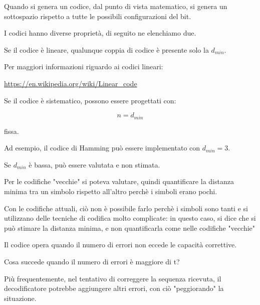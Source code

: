 Quando si genera un codice, dal punto di vista matematico, 
si genera un sottospazio rispetto a tutte le possibili configurazioni del bit. \newline 

I codici hanno diverse proprietà, di seguito ne elenchiamo due. \newline  

Se il codice è lineare, 
qualunque coppia di codice è presente solo la $d_{min}$. \newline 

\begin{tcolorbox}
    Per maggiori informazioni riguardo ai codici lineari: \newline 

    \url{https://en.wikipedia.org/wiki/Linear_code}
\end{tcolorbox}

Se il codice è sistematico, 
possono essere progettati con: 

{
    \Large 
    \begin{equation}
        n = d_{min}
    \end{equation}
}

fissa. \newline 

Ad esempio, il codice di Hamming può essere implementato con $d_{min} = 3$. \newline 

Se $d_{min}$ è bassa, può essere valutata e non stimata. \newline 

\begin{tcolorbox}
Per le codifiche "vecchie" si poteva valutare, quindi quantificare la distanza minima tra un simbolo rispetto all'altro perchè i simboli erano pochi. \newline 

Con le codifiche attuali, ciò non è possibile farlo perchè i simboli sono tanti e si utilizzano delle tecniche di codifica molto complicate: 
in questo caso, si dice che si può stimare la distanza minima, e non quantificarla come nelle codifiche "vecchie"
\end{tcolorbox}

Il codice opera quando il numero di errori non eccede le capacità correttive. \newline 

Cosa succede quando il numero di errori è maggiore di t? \newline 

Più frequentemente, nel tentativo di correggere la sequenza ricevuta, 
il decodificatore potrebbe aggiungere altri errori, 
con ciò "peggiorando" la situazione. \newline 

